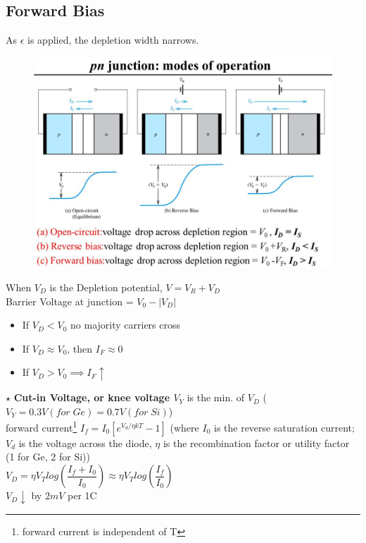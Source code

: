 \documentclass[10pt, a4paper]{report}
\begin{document}
	\subsection{Forward Bias}
	As $\epsilon$ is applied, the depletion width narrows.
	\begin{figure}[h!]
		\centering
		\includegraphics[width=0.7\linewidth]{img/potential-across-diode}
		\caption{}
		\label{fig:potential-across-diode}
	\end{figure}
	When $ V_D $ is the Depletion potential, $ V = V_R + V_D $\\Barrier Voltage at junction = $ V_0 - |V_D| $
	\begin{itemize}
		\item If $ V_D < V_0 $ no majority carriers cross
		\item If $ V_D \approx V_0 $, then  $ I_F \approx 0 $
		\item If $ V_D > V_0 \implies I_F  \uparrow$ 
	\end{itemize}
	$\star$ \textbf{Cut-in Voltage, or knee voltage $ V_Y $} is the min. of $ V_D $ ($ V_Y = 0.3V(for \; Ge) =0.7V(for \; Si) $) \\
	forward current\footnote{forward current is independent of T} $ I_f = I_0[ e^{V_d/\eta k T} - 1] $ (where $ I_0 $ is the reverse saturation current; $ V_d $ is the voltage across the diode, $\eta$ is the recombination factor or utility factor (1 for Ge, 2 for Si)) \\
	$ V_D = \eta V_T log(\dfrac{I_f+I_0}{I_0}) \approx \eta V_T log(\dfrac{I_f}{I_0}) $ \\
	$ V_D \downarrow $ by $ 2 mV $ per 1C
	
\end{document}
